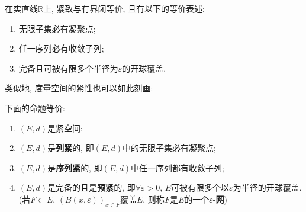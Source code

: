     \begin{Example}
        在实直线$ \mathbb{R} $上, 紧致与有界闭等价, 且有以下的等价表述:
        \begin{enumerate}[(1)]
            \item 无限子集必有凝聚点;
            \item 任一序列必有收敛子列;
            \item 完备且可被有限多个半径为$ \varepsilon $的开球覆盖.
        \end{enumerate}
    \end{Example}

    类似地, 度量空间的紧性也可以如此刻画:

    \begin{Theorem}[紧等价]\label{thm:紧等价}
        下面的命题等价:
        \begin{enumerate}[(1)]
            \item $ (E,d) $是紧空间;
            \item $ (E,d) $是\textbf{列紧}的, 即$ (E,d) $中的无限子集必有凝聚点;
            \item $ (E,d) $是\textbf{序列紧}的, 即$ (E,d) $中任一序列都有收敛子列;
            \item $ (E,d) $是完备的且是\textbf{预紧}的, 即$ \forall\varepsilon>0 $, $ E $可被有限多个以$ \varepsilon $为半径的开球覆盖. (若$ F\subset E $, $ (B(x,\varepsilon))_{x\in F} $覆盖$ E $, 则称$ F $是$ E $的一个$ \varepsilon $-\textbf{网})
        \end{enumerate}
    \end{Theorem}

